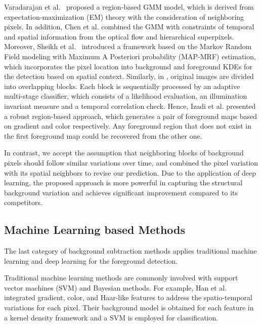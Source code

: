 \documentclass[journal]{IEEEtran}
\begin{document}
Varadarajan et al.\ \cite{2015_PR_Varadarajan20153488} proposed a region-based GMM model,
which is derived from expectation-maximization (EM) theory with the consideration of neighboring pixels.
In addition, 
Chen et al. \cite{2017_TPAMI_GANGWANG} combined the GMM with constraints of temporal and spatial information from the optical flow and hierarchical superpixels.
Moreover, 
Sheikh et al.\ \cite{Sheikh2005Bayesian} introduced a framework based on the Markov Random Field modeling with Maximum A Posteriori 
probability (MAP-MRF) estimation, which incorporates the pixel location into background and foreground KDEs for the detection based on spatial context.
Similarly, in \cite{Reddy2010Robust}, original images are divided into overlapping blocks. Each block is sequentially processed by an adaptive multi-stage classifier, which consists of a likelihood evaluation, an illumination invariant measure and a temporal correlation check.
Hence, Izadi et al.\cite{Izadi2008Robust} presented a robust region-based approach, which generates a pair of foreground maps based on gradient and color respectively. Any foreground region that does not exist in the first foreground map could be recovered from the other one.

In contrast, we accept the assumption that neighboring blocks of background pixels should follow similar variations over time, 
and combined the pixel variation with its spatial neighbors to revise our prediction. 
Due to the application of deep learning, the proposed approach is more powerful in capturing the structural background variation and achieves significant improvement compared to its competitors.
%
%
%
\subsection{Machine Learning based Methods}
The last category of background subtraction methods applies traditional machine learning and deep learning for the foreground detection.

%
Traditional machine learning methods are commonly involved with support vector machines (SVM)\cite{Chen2011}\cite{Han2012} and Bayesian methods\cite{Sheikh2005Bayesian}\cite{2012_TIP_OP_6099616}\cite{Zhang2014Statis}. 
For example, Han et al. \cite{Han2012} integrated gradient, color, and Haar-like features to address the spatio-temporal variations for each pixel. 
Their background model is obtained for each feature in a kernel density framework and a SVM is employed for classification.
\end{document}
